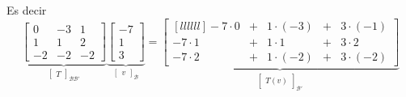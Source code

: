 \documentclass{article}
\theoremstyle{definition}
\theoremstyle{definition}
\theoremstyle{remark}
\begin{document}
Es decir \[
  \underbrace{\begin{bmatrix}0 & -3 & 1 \\ 1 & 1 & 2 \\ -2 & -2 & -2 \end{bmatrix}}_{\begin{bmatrix}
T
\end{bmatrix}_{\mathcal{B}\mathcal{B'}}} 
  \underbrace{\begin{bmatrix}-7 \\ 1 \\ 3 \end{bmatrix}
}_{\begin{bmatrix}v\end{bmatrix}_{\mathcal{B}}}
=
\underbrace{\begin{bmatrix}[llllll] -7 \cdot 0 & + & 1 \cdot (-3) & +& 3 \cdot (-1) \\ -7 \cdot 1 & +& 1 \cdot 1 & +& 3 \cdot 2 \\ -7 \cdot 2 & + & 1 \cdot (-2) & + & 3 \cdot (-2) \end{bmatrix} }_{\begin{bmatrix} T (v) \end{bmatrix}_{\mathcal{B'}}} 
\]
\pagebreak
\end{document}
